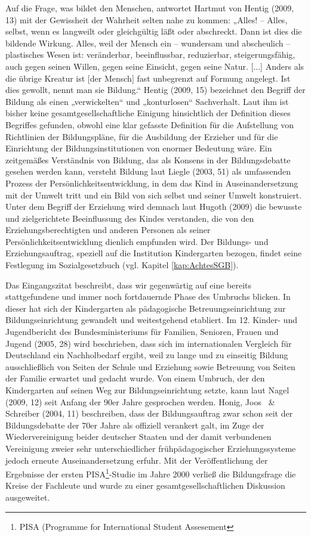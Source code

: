 Auf die Frage, was bildet den Menschen, antwortet Hartmut von Hentig (2009, 13) mit der Gewissheit der Wahrheit selten nahe zu kommen: „Alles! -- Alles, selbst, wenn es langweilt oder gleichgültig läßt oder abschreckt. Dann ist dies die bildende Wirkung. Alles, weil der Mensch ein -- wundersam und abscheulich -- plastisches Wesen ist: veränderbar, beeinflussbar, reduzierbar, steigerungsfähig, auch gegen seinen Willen, gegen seine Einsicht, gegen seine Natur. [...] Anders als die übrige Kreatur ist [der Mensch] fast unbegrenzt auf Formung angelegt. Ist dies gewollt, nennt man sie Bildung.“ 
Hentig (2009, 15) bezeichnet den Begriff der Bildung als einen „verwickelten“ und „konturlosen“ Sachverhalt. Laut ihm ist bisher keine gesamtgesellschaftliche Einigung hinsichtlich der Definition dieses Begriffes gefunden, obwohl eine klar gefasste Definition für die Aufstellung von Richtlinien der Bildungspläne, für die Ausbildung der Erzieher und für die Einrichtung der Bildungsinstitutionen von enormer Bedeutung wäre. 
Ein zeitgemäßes Verständnis von Bildung, das als Konsens in der Bildungsdebatte gesehen werden kann, versteht Bildung laut Liegle (2003, 51) als umfassenden Prozess der Persönlichkeitsentwicklung, in dem das Kind in Auseinandersetzung mit der Umwelt tritt und ein  Bild von sich selbst und seiner Umwelt konstruiert. Unter dem Begriff der Erziehung wird demnach laut Hugoth (2009) die bewusste und zielgerichtete Beeinflussung des Kindes verstanden, die von den Erziehungsberechtigten und anderen Personen als seiner Persönlichkeitsentwicklung dienlich empfunden wird. Der Bildungs- und Erziehungsauftrag, speziell auf die Institution Kindergarten bezogen, findet seine Festlegung im Sozialgesetzbuch (vgl. Kapitel \ref{kap:AchtesSGB}). 

Das Eingangszitat beschreibt, dass wir gegenwärtig auf eine bereits stattgefundene und immer noch fortdauernde Phase des Umbruchs blicken. In dieser hat sich der Kindergarten als pädagogische Betreuungseinrichtung zur Bildungseinrichtung gewandelt und weitestgehend etabliert. Im 12. Kinder- und Jugendbericht des Bundesministeriums für Familien, Senioren, Frauen und Jugend (2005, 28) wird beschrieben, dass sich im internationalen Vergleich für Deutschland ein Nachholbedarf ergibt, weil zu lange und zu einseitig Bildung ausschließlich von Seiten der Schule und Erziehung sowie Betreuung von Seiten der Familie erwartet und gedacht wurde. Von einem Umbruch, der den Kindergarten auf seinen Weg zur Bildungseinrichtung setzte, kann laut Nagel (2009, 12) seit Anfang der 90er Jahre gesprochen werden. Honig, Joos ~\& Schreiber (2004, 11) beschreiben, dass der Bildungsauftrag zwar schon seit der Bildungsdebatte der 70er Jahre als offiziell verankert galt, im Zuge der Wiedervereinigung beider deutscher Staaten und der damit verbundenen Vereinigung zweier sehr unterschiedlicher frühpädagogischer Erziehungssysteme jedoch erneute Auseinandersetzung erfuhr. Mit der Veröffentlichung der Ergebnisse der ersten PISA\footnote{PISA (Programme for International Student Assesement}-Studie im Jahre 2000 verließ die Bildungsfrage die Kreise der Fachleute und wurde zu einer gesamtgesellschaftlichen Diskussion ausgeweitet.  

